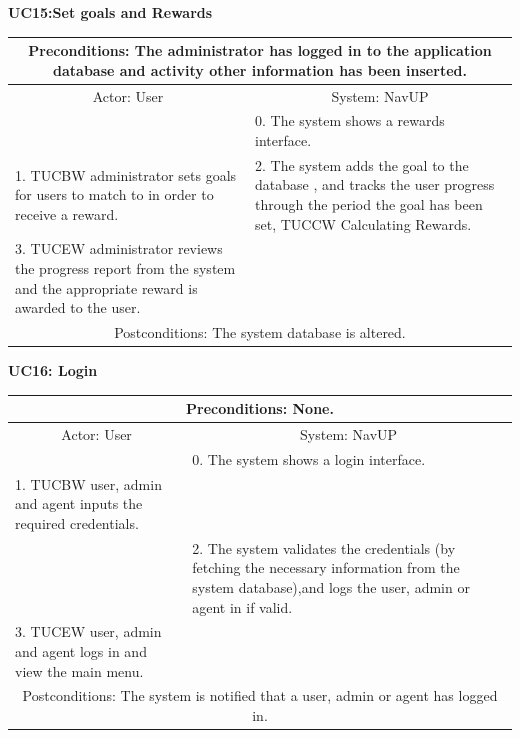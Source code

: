 \documentclass{article}
\begin{document}
				\vspace{5mm}
                \begin{flushleft}
                \textbf{UC15:Set goals and Rewards}\\
                \end{flushleft}
        		\centering		
       		 \small
       		 \begin{tabular}{|p{8cm}|p{8cm}|}
       		 \hline
       		\multicolumn{2}{c}{ Preconditions: The administrator has logged in to the application database and activity other information has been inserted.} \\
       		 \hline
       		\multicolumn{1}{c}{Actor: User} & \multicolumn{1}{c}{ System: NavUP} \\
        		\hline
       		 &0.	The system shows a rewards interface.\\
       		 \hline
       		1.	TUCBW administrator sets goals for users to match to in order to receive a reward.
 &2.	The system adds the goal to the database , and tracks the user progress through the period the goal has been set, TUCCW Calculating Rewards.
\\
        		\hline
       		3.	TUCEW administrator reviews the progress report from the system and the appropriate reward is awarded to the user.&\\
       		 \hline
        		\multicolumn{2}{c}{Postconditions: The system database is altered. } \\
        		\hline
        \end{tabular} 
      
				\vspace{5mm}
                \begin{flushleft}
                \textbf{UC16: Login}\\
				\end{flushleft}
        		\centering		
       		 \small
       		 \begin{tabular}{|p{8cm}|p{8cm}|}
       		 \hline
       		 \multicolumn{2}{c}{Preconditions: None.} \\
       		 \hline
       		\multicolumn{1}{c}{Actor: User} & \multicolumn{1}{c}{ System: NavUP} \\
        		\hline
       		 &0.	The system shows a login interface.\\
       		 \hline
       		1.	TUCBW user, admin and agent inputs the required credentials.\\
 &2.	The system validates the credentials (by fetching the necessary information from the system database),and logs the user, admin or agent in if valid.
\\
        		\hline
       		3.	TUCEW user, admin and agent logs in and view the main menu.&\\
       		 \hline
        		\multicolumn{2}{c}{Postconditions: The system is notified that a user, admin or agent has logged in. } \\
        		\hline
        \end{tabular} 
        
\end{document}
